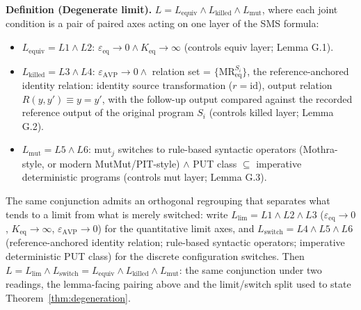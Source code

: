 \documentclass[manuscript,screen,review]{acmart}
\begin{document}
\textbf{Definition (Degenerate limit).}
$L = L_{\mathrm{equiv}} \wedge L_{\mathrm{killed}} \wedge L_{\mathrm{mut}}$, where each joint
condition is a pair of paired axes acting on one layer of the SMS
formula:

\begin{itemize}

\item
  $L_{\mathrm{equiv}} = L1 \wedge L2$: $\varepsilon_{\mathrm{eq}} \to 0 \wedge K_{\mathrm{eq}} \to \infty$ (controls equiv
  layer; Lemma G.1).
\item
  $L_{\mathrm{killed}} = L3 \wedge L4$: $\varepsilon_{\mathrm{AVP}} \to 0 \wedge$ relation set =
  $\{\mathrm{MR}_{\mathrm{eq}}^{S_i}\}$, the reference-anchored identity
  relation: identity source transformation ($r = \mathrm{id}$), output
  relation $R(y,y') \equiv y = y'$, with the follow-up output compared
  against the recorded reference output of the original program $S_i$
  (controls killed layer; Lemma G.2).
\item
  $L_{\mathrm{mut}} = L5 \wedge L6$: $\mathrm{mut}_j$ switches to rule-based syntactic
  operators (Mothra-style, or modern MutMut/PIT-style) $\wedge$ PUT class $\subseteq$ imperative deterministic
  programs (controls mut layer; Lemma G.3).
\end{itemize}

The same conjunction admits an orthogonal regrouping that separates what
tends to a limit from what is merely switched: write
$L_{\mathrm{lim}} = L1 \wedge L2 \wedge L3$
($\varepsilon_{\mathrm{eq}} \to 0$, $K_{\mathrm{eq}} \to \infty$,
$\varepsilon_{\mathrm{AVP}} \to 0$) for the quantitative limit axes, and
$L_{\mathrm{switch}} = L4 \wedge L5 \wedge L6$ (reference-anchored
identity relation; rule-based syntactic operators; imperative
deterministic PUT class) for the discrete configuration switches. Then
$L = L_{\mathrm{lim}} \wedge L_{\mathrm{switch}} = L_{\mathrm{equiv}} \wedge L_{\mathrm{killed}} \wedge L_{\mathrm{mut}}$:
the same conjunction under two readings, the lemma-facing pairing above
and the limit/switch split used to state Theorem~\ref{thm:degeneration}.
\end{document}
